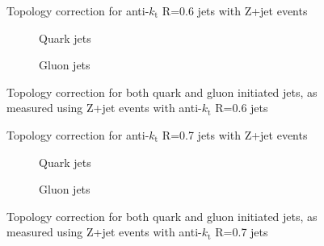 \clearpage
\begin{figure}[!ht]
 \centering
 \caption[Topology correction for anti-$k_{\mathrm t}$ R=0.6 jets with Z+jet events]
 {\small Topology correction for anti-$k_{\mathrm t}$ R=0.6 jets with Z+jet events}
 \label{plot:ZJetTopoCorr6App}
\end{figure}

\begin{figure}[!ht]
 \centering
 \begin{subfigure}{.5\textwidth}
  \centering
  \caption{Quark jets}
 \end{subfigure}%
 \begin{subfigure}{.5\textwidth}
  \centering
  \caption{Gluon jets}
 \end{subfigure}
 \caption[Quark/gluon jet topology correction, anti-$k_{\mathrm t}$ R=0.6, Z+jet]
 {\small Topology correction for both quark and gluon initiated jets, as measured using Z+jet events with anti-$k_{\mathrm t}$ R=0.6 jets}
 \label{plot:ZJetTopoCorrFlav6App}
\end{figure}

\clearpage
\begin{figure}[!ht]
 \centering
 \caption[Topology correction for anti-$k_{\mathrm t}$ R=0.7 jets with Z+jet events]
 {\small Topology correction for anti-$k_{\mathrm t}$ R=0.7 jets with Z+jet events}
 \label{plot:ZJetTopoCorr7App}
\end{figure}

\begin{figure}[!ht]
 \centering
 \begin{subfigure}{.5\textwidth}
  \centering
  \caption{Quark jets}
 \end{subfigure}%
 \begin{subfigure}{.5\textwidth}
  \centering
  \caption{Gluon jets}
 \end{subfigure}
 \caption[Quark/gluon jet topology correction, anti-$k_{\mathrm t}$ R=0.7, Z+jet]
 {\small Topology correction for both quark and gluon initiated jets, as measured using Z+jet events with anti-$k_{\mathrm t}$ R=0.7 jets}
 \label{plot:ZJetTopoCorrFlav7App}
\end{figure}

